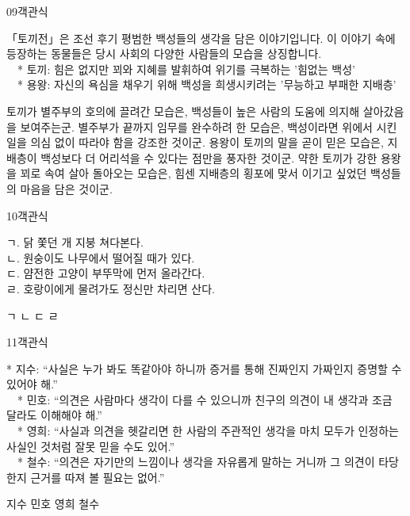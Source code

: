 \documentclass[fs95,seriesFre]{korfarm-base}
\begin{document}
\begin{kfQBlock}{09}{객관식}
\begin{kfEvidence}「토끼전」은 조선 후기 평범한 백성들의 생각을 담은 이야기입니다. 이 이야기 속에 등장하는 동물들은 당시 사회의 다양한 사람들의 모습을 상징합니다. \\\relax
　* 토끼: 힘은 없지만 꾀와 지혜를 발휘하여 위기를 극복하는 '힘없는 백성' \\\relax
　* 용왕: 자신의 욕심을 채우기 위해 백성을 희생시키려는 '무능하고 부패한 지배층'\end{kfEvidence}
\begin{kfChoices}
\kfChoice 토끼가 별주부의 호의에 끌려간 모습은, 백성들이 높은 사람의 도움에 의지해 살아갔음을 보여주는군.
\kfChoice 별주부가 끝까지 임무를 완수하려 한 모습은, 백성이라면 위에서 시킨 일을 의심 없이 따라야 함을 강조한 것이군.
\kfChoice 용왕이 토끼의 말을 곧이 믿은 모습은, 지배층이 백성보다 더 어리석을 수 있다는 점만을 풍자한 것이군.
\kfChoice 약한 토끼가 강한 용왕을 꾀로 속여 살아 돌아오는 모습은, 힘센 지배층의 횡포에 맞서 이기고 싶었던 백성들의 마음을 담은 것이군.
\end{kfChoices}
\end{kfQBlock}

\begin{kfQBlock}{10}{객관식}
\begin{kfEvidence}ㄱ. 닭 쫓던 개 지붕 쳐다본다. \\\relax
ㄴ. 원숭이도 나무에서 떨어질 때가 있다. \\\relax
ㄷ. 얌전한 고양이 부뚜막에 먼저 올라간다. \\\relax
ㄹ. 호랑이에게 물려가도 정신만 차리면 산다.\end{kfEvidence}
\begin{kfChoices}
\kfChoice ㄱ
\kfChoice ㄴ
\kfChoice ㄷ
\kfChoice ㄹ
\end{kfChoices}
\end{kfQBlock}

\begin{kfQBlock}{11}{객관식}
\begin{kfEvidence}* 지수: “사실은 누가 봐도 똑같아야 하니까 증거를 통해 진짜인지 가짜인지 증명할 수 있어야 해.” \\\relax
　* 민호: “의견은 사람마다 생각이 다를 수 있으니까 친구의 의견이 내 생각과 조금 달라도 이해해야 해.” \\\relax
　* 영희: “사실과 의견을 헷갈리면 한 사람의 주관적인 생각을 마치 모두가 인정하는 사실인 것처럼 잘못 믿을 수도 있어.” \\\relax
　* 철수: “의견은 자기만의 느낌이나 생각을 자유롭게 말하는 거니까 그 의견이 타당한지 근거를 따져 볼 필요는 없어.”\end{kfEvidence}
\begin{kfChoices}
\kfChoice 지수
\kfChoice 민호
\kfChoice 영희
\kfChoice 철수
\end{kfChoices}
\end{kfQBlock}
\end{document}
